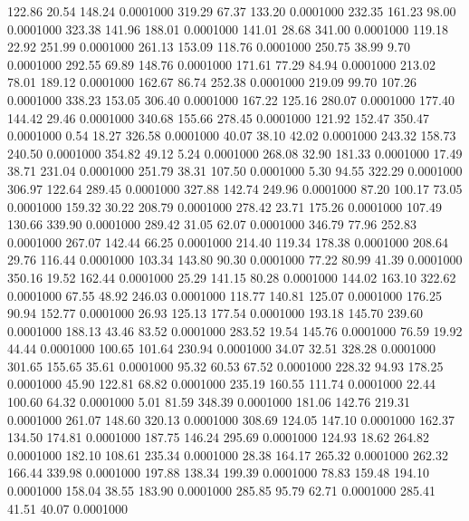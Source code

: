  122.86   20.54  148.24   0.0001000
 319.29   67.37  133.20   0.0001000
 232.35  161.23   98.00   0.0001000
 323.38  141.96  188.01   0.0001000
 141.01   28.68  341.00   0.0001000
 119.18   22.92  251.99   0.0001000
 261.13  153.09  118.76   0.0001000
 250.75   38.99    9.70   0.0001000
 292.55   69.89  148.76   0.0001000
 171.61   77.29   84.94   0.0001000
 213.02   78.01  189.12   0.0001000
 162.67   86.74  252.38   0.0001000
 219.09   99.70  107.26   0.0001000
 338.23  153.05  306.40   0.0001000
 167.22  125.16  280.07   0.0001000
 177.40  144.42   29.46   0.0001000
 340.68  155.66  278.45   0.0001000
 121.92  152.47  350.47   0.0001000
   0.54   18.27  326.58   0.0001000
  40.07   38.10   42.02   0.0001000
 243.32  158.73  240.50   0.0001000
 354.82   49.12    5.24   0.0001000
 268.08   32.90  181.33   0.0001000
  17.49   38.71  231.04   0.0001000
 251.79   38.31  107.50   0.0001000
   5.30   94.55  322.29   0.0001000
 306.97  122.64  289.45   0.0001000
 327.88  142.74  249.96   0.0001000
  87.20  100.17   73.05   0.0001000
 159.32   30.22  208.79   0.0001000
 278.42   23.71  175.26   0.0001000
 107.49  130.66  339.90   0.0001000
 289.42   31.05   62.07   0.0001000
 346.79   77.96  252.83   0.0001000
 267.07  142.44   66.25   0.0001000
 214.40  119.34  178.38   0.0001000
 208.64   29.76  116.44   0.0001000
 103.34  143.80   90.30   0.0001000
  77.22   80.99   41.39   0.0001000
 350.16   19.52  162.44   0.0001000
  25.29  141.15   80.28   0.0001000
 144.02  163.10  322.62   0.0001000
  67.55   48.92  246.03   0.0001000
 118.77  140.81  125.07   0.0001000
 176.25   90.94  152.77   0.0001000
  26.93  125.13  177.54   0.0001000
 193.18  145.70  239.60   0.0001000
 188.13   43.46   83.52   0.0001000
 283.52   19.54  145.76   0.0001000
  76.59   19.92   44.44   0.0001000
 100.65  101.64  230.94   0.0001000
  34.07   32.51  328.28   0.0001000
 301.65  155.65   35.61   0.0001000
  95.32   60.53   67.52   0.0001000
 228.32   94.93  178.25   0.0001000
  45.90  122.81   68.82   0.0001000
 235.19  160.55  111.74   0.0001000
  22.44  100.60   64.32   0.0001000
   5.01   81.59  348.39   0.0001000
 181.06  142.76  219.31   0.0001000
 261.07  148.60  320.13   0.0001000
 308.69  124.05  147.10   0.0001000
 162.37  134.50  174.81   0.0001000
 187.75  146.24  295.69   0.0001000
 124.93   18.62  264.82   0.0001000
 182.10  108.61  235.34   0.0001000
  28.38  164.17  265.32   0.0001000
 262.32  166.44  339.98   0.0001000
 197.88  138.34  199.39   0.0001000
  78.83  159.48  194.10   0.0001000
 158.04   38.55  183.90   0.0001000
 285.85   95.79   62.71   0.0001000
 285.41   41.51   40.07   0.0001000
